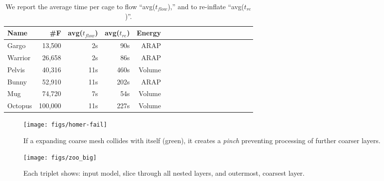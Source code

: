 \documentclass{cgyrf15}
\newcommand{\ra}[1]{\renewcommand{\arraystretch}{#1}}
\begin{document}
\begin{table}[t]
\centering
\ra{1.2}
\setlength{\tabcolsep}{5.5pt}
\begin{tabular}{l r r r r l r r r r r r r r r r r r}
\rowcolor{white}
Name  & \#F & avg($t_{flow}$) & avg($t_{re}$) & Energy\\
\midrule
Gargo & 13,500  & 2s & 90s & ARAP\\
Warrior & 26,658  & 2s & 86s & ARAP  \\
Pelvis & 40,316  & 11s & 460s & Volume  \\
Bunny & 52,910  & 11s & 202s & ARAP \\
Mug & 74,720  & 7s & 54s & Volume \\
Octopus & 100,000  & 11s & 227s & Volume \\
\bottomrule
\end{tabular}
\caption{
We report the average time per cage to flow ``avg($t_{flow}$),'' and to
re-inflate ``avg($t_{re}$)''.}
\label{tab:timings}
\end{table}

\begin{figure}
  \texttt{[image: figs/homer-fail]}
  \caption{If a expanding coarse mesh collides with itself (green), it creates
  a \emph{pinch} preventing processing of further coarser layers.}
  \label{fig:homer}
\end{figure}

\begin{figure*}[t]
  \texttt{[image: figs/zoo\_big]}
  \caption{Each triplet shows: input model, slice through 
  all nested layers, and outermost, coarsest layer. 
  }
  \label{fig:bigzoo}
\end{figure*}



 
\end{document}
